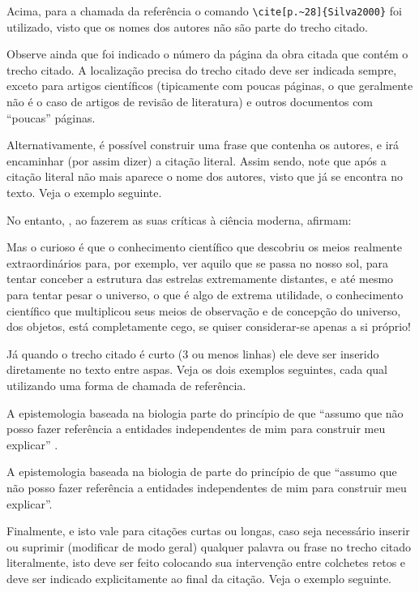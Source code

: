 \begin{apendicesenv}
    Acima, para a chamada da referência o comando \verb|\cite[p.~28]{Silva2000}| foi utilizado, visto que os nomes dos autores não são parte do trecho citado.

    Observe ainda que foi indicado o número da página da obra citada que contém o trecho citado.
    A localização precisa do trecho citado deve ser indicada sempre, exceto para artigos científicos (tipicamente com poucas páginas, o que geralmente não é o caso de artigos de revisão de literatura) e outros documentos com ``poucas'' páginas.

    Alternativamente, é possível construir uma frase que contenha os autores, e irá encaminhar (por assim dizer) a citação literal.
    Assim sendo, note que após a citação literal não mais aparece o nome dos autores, visto que já se encontra no texto.
    Veja o exemplo seguinte.

    No entanto, , ao fazerem as suas críticas à ciência moderna, afirmam:

    \begin{citacao}
        Mas o curioso é que o conhecimento científico que descobriu os meios realmente extraordinários para, por exemplo, ver aquilo que se passa no nosso sol, para tentar conceber a estrutura das estrelas extremamente distantes, e até mesmo para tentar pesar o universo, o que é algo de extrema utilidade, o conhecimento científico que multiplicou seus meios de observação e de concepção do universo, dos objetos, está completamente cego, se quiser considerar-se apenas a si próprio!
    \end{citacao}

    Já quando o trecho citado é curto (3 ou menos linhas) ele deve ser inserido diretamente no texto entre aspas.
    Veja os dois exemplos seguintes, cada qual utilizando uma forma de chamada de referência.

    A epistemologia baseada na biologia parte do princípio de que ``assumo que não posso fazer referência a entidades independentes de mim para construir meu explicar'' \cite[p.~35]{Maturana2003}.

    A epistemologia baseada na biologia de  parte do princípio de que ``assumo que não posso fazer referência a entidades independentes de mim para construir meu explicar''.

    Finalmente, e isto vale para citações curtas ou longas, caso seja necessário inserir ou suprimir (modificar de modo geral) qualquer palavra ou frase no trecho citado literalmente, isto deve ser feito colocando sua intervenção entre colchetes retos e deve ser indicado explicitamente ao final da citação.
    Veja o exemplo seguinte.


\end{apendicesenv}
